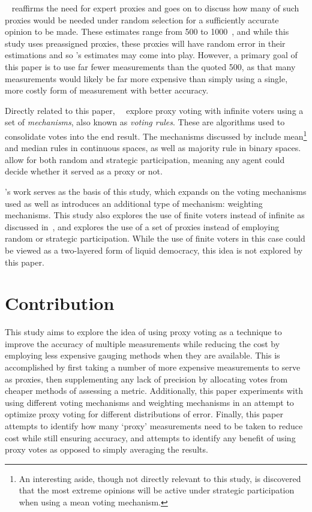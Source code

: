 ~\cite{Mueller1972} reaffirms the need for expert proxies and
goes on to discuss how many of such proxies would be needed under random
selection for a sufficiently accurate opinion to be made.
These estimates range from 500 to 1000~\cite[para.~3.2]{Mueller1972}, and
while this study uses preassigned proxies, these proxies will have random
error in their estimations and so 's estimates may come into
play.
However, a primary goal of this paper is to use far fewer measurements than the
quoted 500, as that many measurements would likely be far more expensive than
simply using a single, more costly form of measurement with better accuracy.

Directly related to this paper,\ ~\cite{Cohensius2017} explore
proxy voting with infinite voters using a set of \textit{mechanisms}, also
known as \textit{voting rules}.
These are algorithms used to consolidate votes into the end result.
The mechanisms discussed by  include mean\footnote{An
interesting aside, though not directly relevant to this
study, is  discovered that the most extreme opinions will be
active under strategic participation when using a mean voting
mechanism\cite[lemma~9]{Cohensius2017}.}
and median rules in continuous spaces, as well as majority rule in
binary spaces.
 allow for both random and strategic participation, meaning any
agent could decide whether it served as a proxy or not.

's work serves as the basis of this study, which expands on
the voting mechanisms used as well as introduces an additional type of
mechanism: weighting mechanisms.
This study also explores the use of finite voters instead of infinite as discussed
in~\cite{Cohensius2017}, and explores the use of a set of proxies instead of
employing random or strategic participation.
While the use of finite voters in this case could be viewed as a two-layered
form of liquid democracy, this idea is not explored by this paper.


\section{Contribution}\label{sec:contribution}
This study aims to explore the idea of using proxy voting as a technique to
improve the accuracy of multiple measurements while reducing the cost by
employing less expensive gauging methods when they are available.
This is accomplished by first taking a number of more expensive measurements to
serve as proxies, then supplementing any lack of precision by allocating
votes from cheaper methods of assessing a metric.
Additionally, this paper experiments with using different voting mechanisms and
weighting mechanisms in an attempt to optimize proxy voting for different
distributions of error.
Finally, this paper attempts to identify how many `proxy' measurements need
to be taken to reduce cost while still ensuring accuracy, and attempts to
identify any benefit of using proxy votes as opposed to simply averaging the
results.

